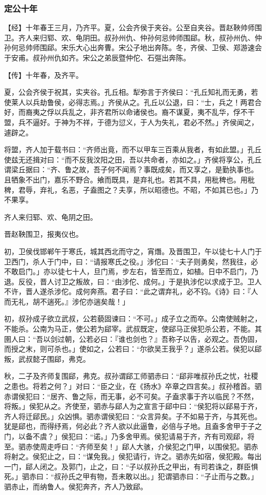 \documentclass[]{article}
\begin{document}
\hypertarget{header-n2982}{%
\subsubsection{定公十年}\label{header-n2982}}

【经】十年春王三月，乃齐平。夏，公会齐侯于夹谷。公至自夹谷。晋赵鞅帅师围卫。齐人来归郓、欢、龟阴田。叔孙州仇、仲孙何忌帅师围郈。秋，叔孙州仇、仲孙何忌帅师围郈。宋乐大心出奔曹。宋公子地出奔陈。冬，齐侯、卫侯、郑游速会于安甫。叔孙州仇如齐。宋公之弟辰暨仲佗、石彄出奔陈。

【传】十年春，及齐平。

夏，公会齐侯于祝其，实夹谷。孔丘相。犁弥言于齐侯曰：``孔丘知礼而无勇，若使莱人以兵劫鲁侯，必得志焉。」齐侯从之。孔丘以公退，曰：``士，兵之！两君合好，而裔夷之俘以兵乱之，非齐君所以命诸侯也。裔不谋夏，夷不乱华，俘不干盟，兵不逼好。于神为不祥，于德为愆义，于人为失礼，君必不然。」齐侯闻之，遽辟之。

将盟，齐人加于载书曰：``齐师出竟，而不以甲车三百乘从我者，有如此盟。」孔丘使兹无还揖对曰：``而不反我汶阳之田，吾以共命者，亦如之。」齐侯将享公，孔丘谓梁丘据曰：``齐、鲁之故，吾子何不闻焉？事既成矣，而又享之，是勤执事也。且牺象不出门，嘉乐不野合。飨而既具，是弃礼也。若其不具，用秕稗也。用秕稗，君辱，弃礼，名恶，子盍图之？夫享，所以昭德也。不昭，不如其已也。」乃不果享。

齐人来归郓、欢、龟阴之田。

晋赵鞅围卫，报夷仪也。

初，卫侯伐邯郸午于寒氏，城其西北而守之，宵熸。及晋围卫，午以徒七十人门于卫西门，杀人于门中，曰：``请报寒氏之役。」涉佗曰：``夫子则勇矣，然我往，必不敢启门。」亦以徒七十人，旦门焉，步左右，皆至而立，如植。日中不启门，乃退。反役，晋人讨卫之叛故，曰：``由涉佗、成何。」于是执涉佗以求成于卫。卫人不许，晋人遂杀涉佗。成何奔燕。君子曰：``此之谓弃礼，必不钧。《诗》曰：『人而无礼，胡不遄死。』涉佗亦遄矣哉！」

初，叔孙成子欲立武叔，公若藐固谏曰：``不可。」成子立之而卒。公南使贼射之，不能杀。公南为马正，使公若为郈宰。武叔既定，使郈马正侯犯杀公若，不能。其圉人曰：``吾以剑过朝，公若必曰：『谁也剑也？』吾称子以告，必观之。吾伪固，而授之末，则可杀也。」使如之，公若曰：``尔欲吴王我乎？」遂杀公若。侯犯以郈叛，武叔懿子围郈，弗克。

秋，二子及齐师复围郈，弗克。叔孙谓郈工师驷赤曰：``郈非唯叔孙氏之忧，社稷之患也。将若之何？」对曰：``臣之业，在《扬水》卒章之四言矣。」叔孙稽首。驷赤谓侯犯曰：``居齐、鲁之际，而无事，必不可矣。子盍求事于齐以临民？不然，将叛。」侯犯从之。齐使至，驷赤与郈人为之宣言于郈中曰：``侯犯将以郈易于齐，齐人将迁郈民。」众凶惧。驷赤谓侯犯曰：``众言异矣。子不如易于齐，与其死也。犹是郈也，而得纾焉，何必此？齐人欲以此逼鲁，必倍与子地。且盍多舍甲于子之门，以备不虞？」侯犯曰：``诺。」乃多舍甲焉。侯犯请易于齐，齐有司观郈，将至。驷赤使周走呼曰：``齐师至矣！」郈人大骇，介侯犯之门甲，以围侯犯。驷赤将射之。侯犯止之，曰：``谋免我。」侯犯请行，许之。驷赤先如宿，侯犯殿。每出一门，郈人闭之。及郭门，止之，曰：``子以叔孙氏之甲出，有司若诛之，群臣惧死。」驷赤曰：``叔孙氏之甲有物，吾未敢以出。」犯谓驷赤曰：``子止而与之数。」驷赤止，而纳鲁人。侯犯奔齐，齐人乃致郈。
\end{document}
